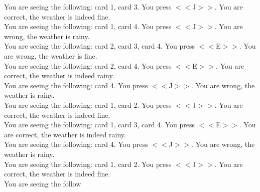 \documentclass[pdflatex,sn-nature]{sn-jnl}%
\theoremstyle{thmstyleone}%
\theoremstyle{thmstyletwo}%
\theoremstyle{thmstylethree}%
\begin{document}
You are seeing the following: card 1, card 3. You press $<<$J$>>$. You are correct, the weather is indeed fine. $~$\\ 
You are seeing the following: card 1, card 4. You press $<<$J$>>$. You are wrong, the weather is rainy. $~$\\ 
You are seeing the following: card 2, card 3, card 4. You press $<<$E$>>$. You are wrong, the weather is fine. $~$\\ 
You are seeing the following: card 2, card 4. You press $<<$E$>>$. You are correct, the weather is indeed rainy. $~$\\ 
You are seeing the following: card 4. You press $<<$J$>>$. You are wrong, the weather is rainy. $~$\\ 
You are seeing the following: card 1, card 2. You press $<<$J$>>$. You are correct, the weather is indeed fine. $~$\\ 
You are seeing the following: card 1, card 3, card 4. You press $<<$E$>>$. You are correct, the weather is indeed rainy. $~$\\ 
You are seeing the following: card 4. You press $<<$J$>>$. You are wrong, the weather is rainy. $~$\\ 
You are seeing the following: card 1, card 2. You press $<<$J$>>$. You are correct, the weather is indeed fine. $~$\\ 
You are seeing the follow 
\end{document}
